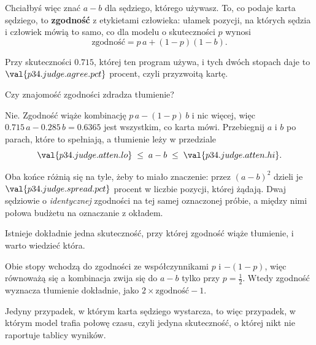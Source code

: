\begin{fr}
Chciałbyś więc znać $a - b$ dla sędziego, którego używasz. To, co podaje
karta sędziego, to \textbf{zgodność} z etykietami człowieka: ułamek pozycji,
na których sędzia i człowiek mówią to samo, co dla modelu o skuteczności $p$
wynosi
\[ \text{zgodność} = p\,a + (1-p)(1-b) . \]

Przy skuteczności $\num{0.715}$, której ten program używa, i tych dwóch
stopach daje to $\val{p34.judge.agree.pct}$ procent, czyli przyzwoitą
kartę.

Czy znajomość zgodności zdradza tłumienie?
\dotline
\nextframe
\end{fr}

\begin{fr}
\begin{ansblock}
Nie. Zgodność wiąże kombinację $p\,a - (1-p)\,b$ i nic więcej, więc
$\num{0.715}\,a - \num{0.285}\,b = \num{0.6365}$ jest wszystkim, co karta
mówi. Przebiegnij $a$ i $b$ po parach, które to spełniają, a tłumienie leży
w przedziale
\[ \val{p34.judge.atten.lo} \;\le\; a - b \;\le\;
   \val{p34.judge.atten.hi} . \]
\end{ansblock}

Oba końce różnią się na tyle, żeby to miało znaczenie: przez $(a-b)^{2}$
dzieli je $\val{p34.judge.spread.pct}$ procent w liczbie pozycji, której
żądają. Dwaj sędziowie o \emph{identycznej} zgodności na tej samej
oznaczonej próbie, a między nimi połowa budżetu na oznaczanie z okładem.
\end{fr}

\begin{fr}
\begin{trapbox}
Istnieje dokładnie jedna skuteczność, przy której zgodność wiąże tłumienie,
i warto wiedzieć która.

Obie stopy wchodzą do zgodności ze współczynnikami $p$ i $-(1-p)$, więc
równoważą się \dash{} a kombinacja zwija się do $a - b$ \dash{} tylko przy
$p = \frac{1}{2}$. Wtedy zgodność wyznacza tłumienie dokładnie, jako
$2\times\text{zgodność} - 1$.

Jedyny przypadek, w którym karta sędziego wystarcza, to więc przypadek, w
którym model trafia połowę czasu, czyli jedyna skuteczność, o której nikt nie
raportuje tablicy wyników.
\end{trapbox}
\end{fr}

